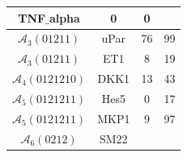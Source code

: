 \begin{table}[!t]
\begin{tabular}{|c|c||c|c|}
TNF$\_$alpha

&

0

&

0

\\ \hline

$\mathcal{A}_{3}(01211)$

&

uPar

&

76

&

99

\\ \hline

$\mathcal{A}_{3}(01211)$

&

ET1

&

8

&

19

\\ \hline

$\mathcal{A}_{4}(0121210)$

&

DKK1

&

13

&

43

\\ \hline

$\mathcal{A}_{5}(0121211)$

&

Hes5


&

0

&

17

\\ \hline

$\mathcal{A}_{5}(0121211)$

&

MKP1


&

9

&

97

\\ \hline

$\mathcal{A}_{6}(0212)$

&

SM22


&


\end{tabular}
\end{table}
